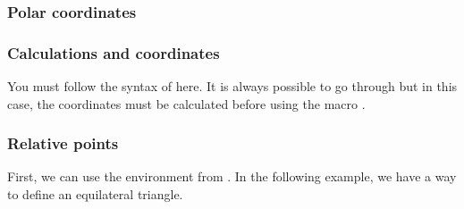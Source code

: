 \subsubsection{Polar coordinates}

\begin{tkzexample}
\end{tkzexample}

\newpage

\subsubsection{Calculations and coordinates}

You must follow the syntax of  here. It is always possible to
go through  but in this case, the coordinates must be
calculated before using the macro .

\begin{tkzexample}[latex=6cm,small]
\end{tkzexample}

\subsubsection{Relative points}

First, we can use the  environment from \TIKZ.
In the following example, we have a way to define an equilateral triangle.

\begin{tkzexample}[latex=7cm,small]
\end{tkzexample}

